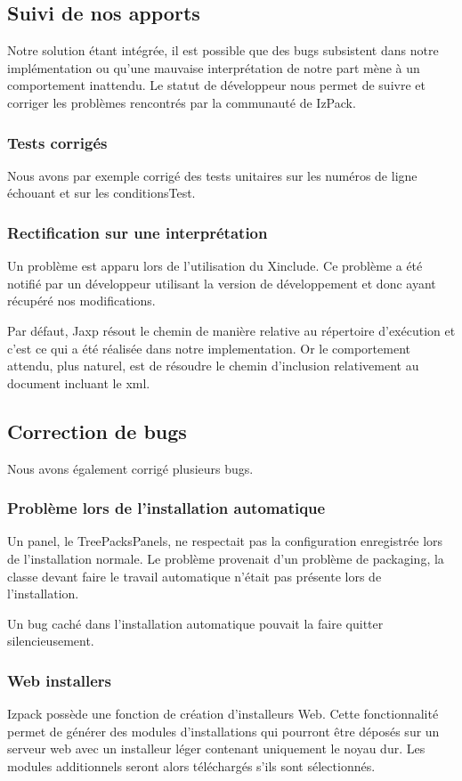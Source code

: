 \subsection{Suivi de nos apports}
Notre solution étant intégrée, il est possible que des bugs subsistent dans notre implémentation ou qu'une mauvaise interprétation de notre part mène à un comportement inattendu.
Le statut de développeur nous permet de suivre et corriger les problèmes rencontrés par la communauté de IzPack.
\subsubsection{Tests corrigés}
Nous avons par exemple corrigé des tests unitaires sur les numéros de ligne échouant et sur les conditionsTest.
\subsubsection{Rectification sur une interprétation}
Un problème est apparu lors de l'utilisation du Xinclude.
Ce problème a été notifié par un développeur utilisant la version de développement et donc ayant récupéré nos modifications.

Par défaut, Jaxp résout le chemin de manière relative au répertoire d'exécution et c'est ce qui a été réalisée dans notre implementation.
Or le comportement attendu, plus naturel, est de résoudre le chemin d'inclusion relativement au document incluant le xml.

\subsection{Correction de bugs}
Nous avons également corrigé plusieurs bugs.
\subsubsection{Problème lors de l'installation automatique}
Un panel, le TreePacksPanels, ne respectait pas la configuration enregistrée lors de l'installation normale. 
Le problème provenait d'un problème de packaging, la classe devant faire le travail automatique n'était pas présente lors de l'installation.

Un bug caché dans l'installation automatique pouvait la faire quitter silencieusement.
\subsubsection{Web installers}
Izpack possède une fonction de création d'installeurs Web.
Cette fonctionnalité permet de générer des modules d'installations qui pourront être déposés sur un serveur web avec un installeur léger contenant uniquement le noyau dur.
Les modules additionnels seront alors téléchargés s'ils sont sélectionnés.

